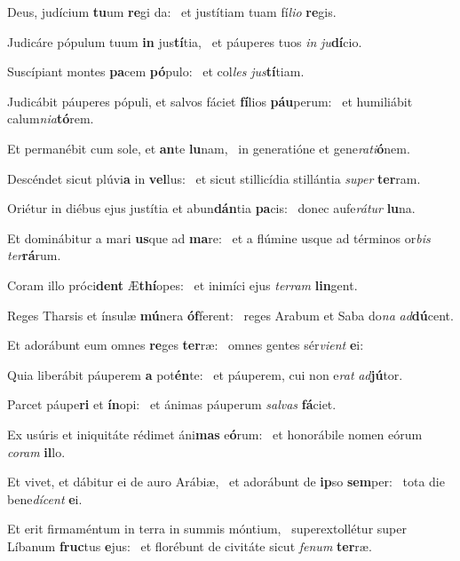 \item Deus, judícium \textbf{tu}um \textbf{re}gi da:~\psstar{} et justítiam tuam fí\textit{lio} \textbf{re}gis.
\item Judicáre pópulum tuum \textbf{in} jus\textbf{tí}tia,~\psstar{} et páuperes tuos \textit{in} \textit{ju}\textbf{dí}cio.
\item Suscípiant montes \textbf{pa}cem \textbf{pó}pulo:~\psstar{} et col\textit{les} \textit{jus}\textbf{tí}tiam.
\item Judicábit páuperes pópuli, et salvos fáciet \textbf{fí}lios \textbf{páu}perum:~\psstar{} et humiliábit calum\textit{nia}\textbf{tó}rem.
\item Et permanébit cum sole, et \textbf{an}te \textbf{lu}nam,~\psstar{} in generatióne et gene\textit{rati}\textbf{ó}nem.
\item Descéndet sicut plúvi\textbf{a} in \textbf{vel}lus:~\psstar{} et sicut stillicídia stillántia \textit{super} \textbf{ter}ram.
\item Oriétur in diébus ejus justítia et abun\textbf{dán}tia \textbf{pa}cis:~\psstar{} donec aufe\textit{rátur} \textbf{lu}na.
\item Et dominábitur a mari \textbf{us}que ad \textbf{ma}re:~\psstar{} et a flúmine usque ad términos or\textit{bis} \textit{ter}\textbf{rá}rum.
\item Coram illo próci\textbf{dent} Æ\textbf{thí}opes:~\psstar{} et inimíci ejus \textit{terram} \textbf{lin}gent.
\item Reges Tharsis et ínsulæ \textbf{mú}nera \textbf{óf}ferent:~\psstar{} reges Arabum et Saba do\textit{na} \textit{ad}\textbf{dú}cent.
\item Et adorábunt eum omnes \textbf{re}ges \textbf{ter}ræ:~\psstar{} omnes gentes sér\textit{vient} \textbf{e}i:
\item Quia liberábit páuperem \textbf{a} pot\textbf{én}te:~\psstar{} et páuperem, cui non e\textit{rat} \textit{ad}\textbf{jú}tor.
\item Parcet páupe\textbf{ri} et \textbf{ín}opi:~\psstar{} et ánimas páuperum \textit{salvas} \textbf{fá}ciet.
\item Ex usúris et iniquitáte rédimet áni\textbf{mas} e\textbf{ó}rum:~\psstar{} et honorábile nomen eórum \textit{coram} \textbf{il}lo.
\item Et vivet, et dábitur ei de auro Arábiæ,~\pscross{} et adorábunt de \textbf{ip}so \textbf{sem}per:~\psstar{} tota die bene\textit{dícent} \textbf{e}i.
\item Et erit firmaméntum in terra in summis móntium,~\pscross{} superextollétur super Líbanum \textbf{fruc}tus \textbf{e}jus:~\psstar{} et florébunt de civitáte sicut \textit{fenum} \textbf{ter}ræ.
